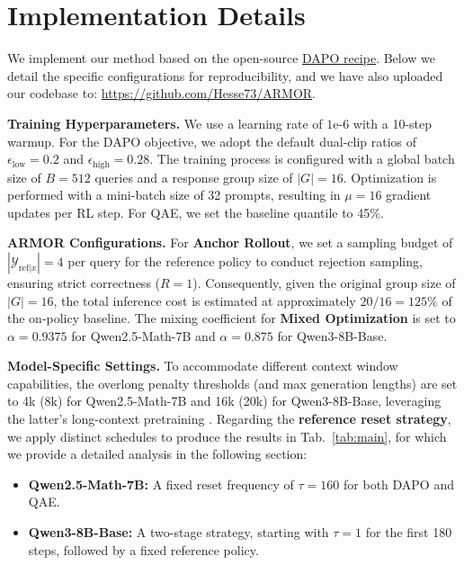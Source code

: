 

\section{Implementation Details}\label{appendix:impl}
We implement our method based on the open-source \href{https://github.com/verl-project/verl/tree/v0.5.0/recipe/dapo}{DAPO recipe}. 
Below we detail the specific configurations for reproducibility, and we have also uploaded our codebase to: \href{https://github.com/Hesse73/ARMOR}{https://github.com/Hesse73/ARMOR}.

\textbf{Training Hyperparameters.}
We use a learning rate of $1\text{e-}6$ with a 10-step warmup. 
For the DAPO objective, we adopt the default dual-clip ratios of $\epsilon_\mathrm{low}=0.2$ and $\epsilon_\mathrm{high}=0.28$.
The training process is configured with a global batch size of $B=512$ queries and a response group size of $|G| = 16$.
Optimization is performed with a mini-batch size of 32 prompts, resulting in $\mu = 16$ gradient updates per RL step.
For QAE, we set the baseline quantile to 45\%.

\textbf{ARMOR Configurations.}
For \textbf{Anchor Rollout}, we set a sampling budget of $|\mathcal Y_{\text{ref}|x}| = 4$ per query for the reference policy to conduct rejection sampling, ensuring strict correctness ($R=1$).
Consequently, given the original group size of $|G|=16$, the total inference cost is estimated at approximately $20/16 = 125\%$ of the on-policy baseline.
The mixing coefficient for \textbf{Mixed Optimization} is set to $\alpha = 0.9375$ for Qwen2.5-Math-7B and $\alpha = 0.875$ for Qwen3-8B-Base.

\textbf{Model-Specific Settings.}
To accommodate different context window capabilities, the overlong penalty thresholds (and max generation lengths) are set to 4k (8k) for Qwen2.5-Math-7B and 16k (20k) for Qwen3-8B-Base, leveraging the latter's long-context pretraining \citep{Qwen3}.
Regarding the \textbf{reference reset strategy}, we apply distinct schedules to produce the results in Tab.~\ref{tab:main}, for which we provide a detailed analysis in the following section:
\begin{itemize}[nosep]
    \item \textbf{Qwen2.5-Math-7B:} A fixed reset frequency of $\tau = 160$ for both DAPO and QAE.
    \item \textbf{Qwen3-8B-Base:} A two-stage strategy, starting with $\tau = 1$ for the first 180 steps, followed by a fixed reference policy.
\end{itemize}

